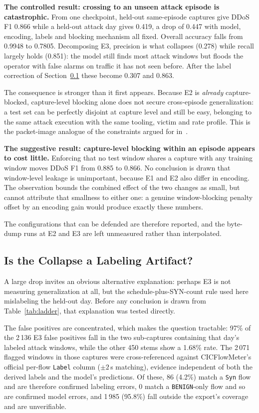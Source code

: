 \documentclass[conference]{IEEEtran} \IEEEoverridecommandlockouts
\begin{document}
\textbf{The controlled result: crossing to an unseen attack episode is
catastrophic.} From one checkpoint, held-out same-episode captures give DDoS F1
0.866 while a held-out attack day gives 0.419, a drop of 0.447 with model,
encoding, labels and blocking mechanism all fixed. Overall accuracy falls from
0.9948 to 0.7805. Decomposing E3, precision is what collapses (0.278) while
recall largely holds (0.851): the model still finds most attack windows but
floods the operator with false alarms on traffic it has not seen before. After
the label correction of Section~\ref{sec:audit} these become 0.307 and 0.863.

The consequence is stronger than it first appears. Because E2 is
\emph{already} capture-blocked, capture-level blocking alone does not secure
cross-episode generalization: a test set can be perfectly disjoint at capture
level and still be easy, belonging to the same attack execution with the same
tooling, victim and rate profile. This is the packet-image analogue of the
constraints argued for in~\cite{pendlebury2019tesseract}.

\textbf{The suggestive result: capture-level blocking within an episode appears
to cost little.} Enforcing that no test window shares a capture with any
training window moves DDoS F1 from 0.885 to 0.866. No conclusion is drawn that
window-level leakage is unimportant, because E1 and E2 also differ in encoding.
The observation bounds the combined effect of the two changes as small, but
cannot attribute that smallness to either one: a genuine window-blocking
penalty offset by an encoding gain would produce exactly these numbers.

The configurations that can be defended are therefore reported, and the
byte-dump runs at E2 and E3 are left unmeasured rather than interpolated.

\subsection{Is the Collapse a Labeling Artifact?} \label{sec:audit} A large
drop invites an obvious alternative explanation: perhaps E3 is not measuring
generalization at all, but the schedule-plus-SYN-count rule used here
mislabeling the held-out day. Before any conclusion is drawn from
Table~\ref{tab:ladder}, that explanation was tested directly.

The false positives are concentrated, which makes the question tractable: 97\%
of the 2\,136 E3 false positives fall in the two sub-captures containing that
day's labeled attack windows, while the other 450 stems show a 1.68\% rate. The 2\,071 flagged windows in those captures were cross-referenced against
CICFlowMeter's official per-flow \texttt{Label} column ($\pm 2$\,s matching),
evidence independent of both the derived labels and the model's predictions. Of
these, 86 (4.2\%) match a \texttt{Syn} flow and are therefore confirmed
labeling errors, 0 match a \texttt{BENIGN}-only flow and so are confirmed model
errors, and 1\,985 (95.8\%) fall outside the export's coverage and are
unverifiable.
\end{document}
